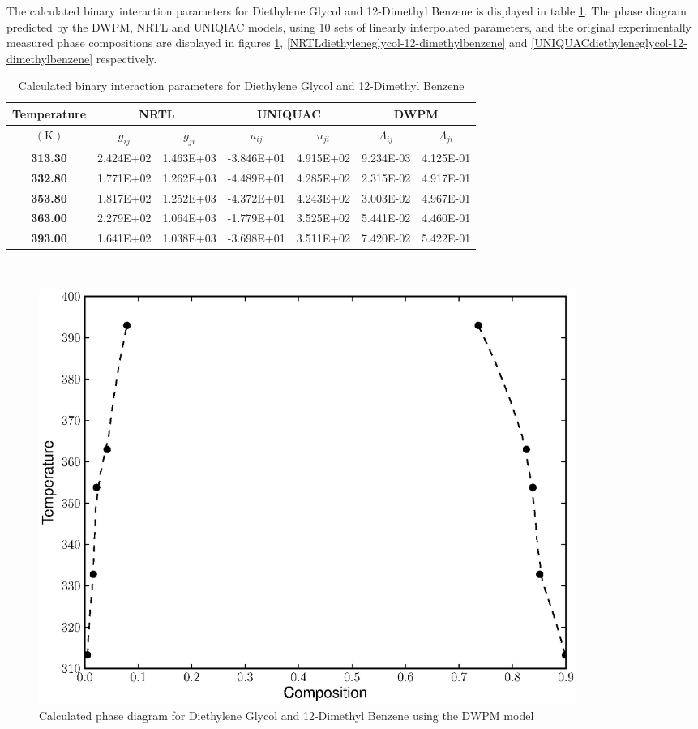 The calculated binary interaction parameters for  Diethylene Glycol and 12-Dimethyl Benzene is displayed in table \ref{DiethyleneGlycoland12-DimethylBenzeneTable}. The phase diagram predicted by the DWPM, NRTL and UNIQIAC models, using 10 sets of linearly interpolated parameters, and the original experimentally measured phase compositions are displayed in figures \ref{DWPMdiethyleneglycol-12-dimethylbenzene}, \ref{NRTLdiethyleneglycol-12-dimethylbenzene} and \ref{UNIQUACdiethyleneglycol-12-dimethylbenzene} respectively.\\

\begin{table}
\begin{tabularx}{\textwidth}{c|cc|cc|cc}
\hline
\textbf{Temperature}&\multicolumn{2}{c|}{\textbf{NRTL}}&\multicolumn{2}{c|}{\textbf{UNIQUAC}}&\multicolumn{2}{c}{\textbf{DWPM}}\\
\hline
\hline 
$\left(\mathrm{K}\right)$&$g_{ij}$&$g_{ji}$&$u_{ij}$&$u_{ji}$&$\Lambda_{ij}$&$\Lambda_{ji}$\\
\hline
\textbf{ 313.30 } & 2.424E+02 & 1.463E+03 & -3.846E+01 & 4.915E+02 & 9.234E-03 & 4.125E-01\\
\textbf{ 332.80 } & 1.771E+02 & 1.262E+03 & -4.489E+01 & 4.285E+02 & 2.315E-02 & 4.917E-01\\
\textbf{ 353.80 } & 1.817E+02 & 1.252E+03 & -4.372E+01 & 4.243E+02 & 3.003E-02 & 4.967E-01\\
\textbf{ 363.00 } & 2.279E+02 & 1.064E+03 & -1.779E+01 & 3.525E+02 & 5.441E-02 & 4.460E-01\\
\textbf{ 393.00 } & 1.641E+02 & 1.038E+03 & -3.698E+01 & 3.511E+02 & 7.420E-02 & 5.422E-01\\
\hline
\end{tabularx}\\
\caption{Calculated binary interaction parameters for Diethylene Glycol and 12-Dimethyl Benzene} \label{DiethyleneGlycoland12-DimethylBenzeneTable}
\end{table}

\begin{figure}[hp]
\centering
\includegraphics[width = 0.85\textwidth]{Results_Parts/BinaryParams/diethyleneglycol-12-dimethylbenzene/DWPM/PhaseDiagram.eps}
\caption{Calculated phase diagram for Diethylene Glycol and 12-Dimethyl Benzene using the DWPM model} \label{DWPMdiethyleneglycol-12-dimethylbenzene}
\end{figure}\

